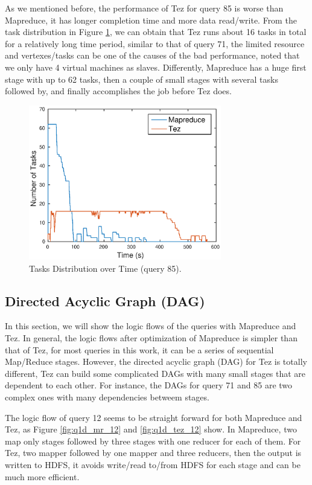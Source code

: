 \documentclass[10pt]{article}
\begin{document}
As we mentioned before, the performance of Tez for query 85 is worse than Mapreduce, it has longer completion time and more data read/write. From the task distribution in Figure \ref{fig:q1c_tasks_85}, we can obtain that Tez runs about 16 tasks in total for a relatively long time period, similar to that of query 71, the limited resource and vertexes/tasks can be one of the causes of the bad performance, noted that we only have 4 virtual machines as slaves. Differently, Mapreduce has a huge first stage with up to 62 tasks, then a couple of small stages with several tasks followed by, and finally accomplishes the job before Tez does.
\begin{figure}
\begin{center}
\includegraphics[width=0.75\textwidth]{pic/q1c_task_distribution_85}
\caption{Tasks Distribution over Time (query 85).}
\label{fig:q1c_tasks_85}
\end{center}
\end{figure}


\subsection{Directed Acyclic Graph (DAG)}
In this section, we will show the logic flows of the queries with Mapreduce and Tez. In general, the logic flows after optimization of Mapreduce is simpler than that of Tez, for most queries in this work, it can be a series of sequential Map/Reduce stages. However, the directed acyclic graph (DAG) for Tez is totally different, Tez can build some complicated DAGs with many small stages that are dependent to each other. For instance, the DAGs for query 71 and 85 are two complex ones with many dependencies betweem stages. 

The logic flow of query 12 seems to be straight forward for both Mapreduce and Tez, as Figure \ref{fig:q1d_mr_12} and \ref{fig:q1d_tez_12} show. In Mapreduce, two map only stages followed by three stages with one reducer for each of them. For Tez, two mapper followed by one mapper and three reducers, then the output is written to HDFS, it avoids write/read to/from HDFS for each stage and can be much more efficient.
\end{document}
